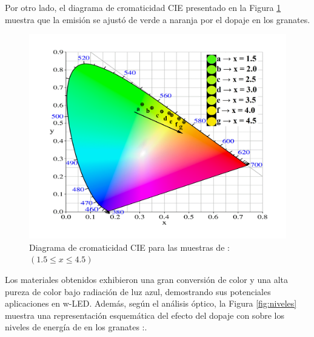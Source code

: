 Por otro lado, el diagrama de cromaticidad CIE presentado en la Figura
\ref{fig:croma}
muestra que la emisión se ajustó de verde a naranja por el dopaje 
en los
granates.\\

\begin{figure}[t!]
    \centering%

    \includegraphics[width=\textwidth]{Kap4/Cromaticidad.png}%
    \caption{Diagrama de cromaticidad CIE para las muestras de
    :	$(1.5\leq x\leq
        4.5)$}\label{fig:croma}
\end{figure}

Los materiales obtenidos exhibieron una gran conversión de color y una alta
pureza de color bajo radiación de luz azul, demostrando sus potenciales
aplicaciones en w-LED. Además, según el análisis óptico, la Figura
\ref{fig:niveles}
muestra
una representación esquemática del efecto
del dopaje con  sobre los niveles de energía de  en los
granates
:.\\

